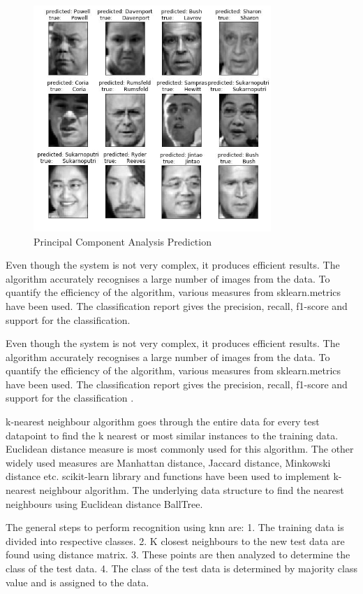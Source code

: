 \documentclass[conference]{IEEEtran}
\begin{document}
\begin{figure}[h!]
 \centering
 \includegraphics[width = 9cm]{PCA_pred.JPG}
 \caption{ Principal Component Analysis Prediction}
 \label{fig 7: Principal Component Analysis Prediction}
\end{figure}

Even though the system is not very complex, it produces efficient results. The algorithm accurately recognises a large number of images from the data. To quantify the efficiency of the algorithm, various measures from sklearn.metrics have been used. The classification report gives the precision, recall, f1-score and support for the classification. 

Even though the system is not very complex, it produces efficient results. The algorithm accurately recognises a large number of images from the data. To quantify the efficiency of the algorithm, various measures from sklearn.metrics have been used. The classification report gives the precision, recall, f1-score and support for the classification \cite{scikit-learn}.

k-nearest neighbour algorithm goes through the entire data for every test datapoint to find the k nearest or most similar instances to the training data. Euclidean distance measure is most commonly used for this algorithm. The other widely used measures are Manhattan distance, Jaccard distance, Minkowski distance etc. scikit-learn library and functions have been used to implement k-nearest neighbour algorithm. The underlying data structure to find the nearest neighbours using Euclidean distance BallTree. 

The general steps to perform recognition using knn are:
	1. The training data is divided into respective classes.
	2. K closest neighbours to the new test data are found using distance matrix.
	3. These points are then analyzed to determine the class of the test data.
 	4. The class of the test data is determined by majority class value and is assigned to the data.
\end{document}
